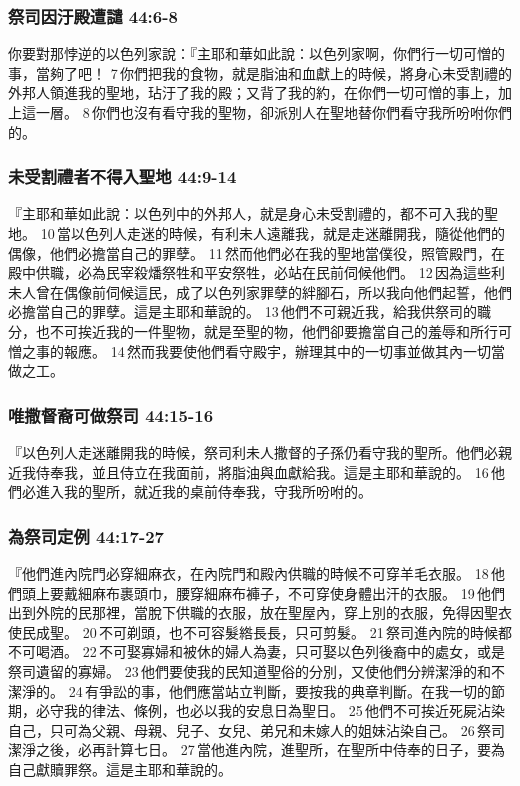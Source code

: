 \subsubsection{祭司因汙殿遭譴 44:6-8}
你要對那悖逆的以色列家說：『主耶和華如此說：以色列家啊，你們行一切可憎的事，當夠了吧！ 7 你們把我的食物，就是脂油和血獻上的時候，將身心未受割禮的外邦人領進我的聖地，玷汙了我的殿；又背了我的約，在你們一切可憎的事上，加上這一層。 8 你們也沒有看守我的聖物，卻派別人在聖地替你們看守我所吩咐你們的。

\subsubsection{未受割禮者不得入聖地 44:9-14}
『主耶和華如此說：以色列中的外邦人，就是身心未受割禮的，都不可入我的聖地。 10 當以色列人走迷的時候，有利未人遠離我，就是走迷離開我，隨從他們的偶像，他們必擔當自己的罪孽。 11 然而他們必在我的聖地當僕役，照管殿門，在殿中供職，必為民宰殺燔祭牲和平安祭牲，必站在民前伺候他們。 12 因為這些利未人曾在偶像前伺候這民，成了以色列家罪孽的絆腳石，所以我向他們起誓，他們必擔當自己的罪孽。這是主耶和華說的。 13 他們不可親近我，給我供祭司的職分，也不可挨近我的一件聖物，就是至聖的物，他們卻要擔當自己的羞辱和所行可憎之事的報應。 14 然而我要使他們看守殿宇，辦理其中的一切事並做其內一切當做之工。

\subsubsection{唯撒督裔可做祭司 44:15-16}
『以色列人走迷離開我的時候，祭司利未人撒督的子孫仍看守我的聖所。他們必親近我侍奉我，並且侍立在我面前，將脂油與血獻給我。這是主耶和華說的。 16 他們必進入我的聖所，就近我的桌前侍奉我，守我所吩咐的。

\subsubsection{為祭司定例 44:17-27}
『他們進內院門必穿細麻衣，在內院門和殿內供職的時候不可穿羊毛衣服。 18 他們頭上要戴細麻布裹頭巾，腰穿細麻布褲子，不可穿使身體出汗的衣服。 19 他們出到外院的民那裡，當脫下供職的衣服，放在聖屋內，穿上別的衣服，免得因聖衣使民成聖。 20 不可剃頭，也不可容髮綹長長，只可剪髮。 21 祭司進內院的時候都不可喝酒。 22 不可娶寡婦和被休的婦人為妻，只可娶以色列後裔中的處女，或是祭司遺留的寡婦。 23 他們要使我的民知道聖俗的分別，又使他們分辨潔淨的和不潔淨的。 24 有爭訟的事，他們應當站立判斷，要按我的典章判斷。在我一切的節期，必守我的律法、條例，也必以我的安息日為聖日。 25 他們不可挨近死屍沾染自己，只可為父親、母親、兒子、女兒、弟兄和未嫁人的姐妹沾染自己。 26 祭司潔淨之後，必再計算七日。 27 當他進內院，進聖所，在聖所中侍奉的日子，要為自己獻贖罪祭。這是主耶和華說的。

